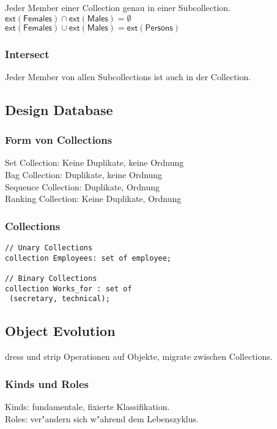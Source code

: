 \documentclass[german, 10pt, a4paper, twocolumn]{scrartcl}
\theoremstyle{definition}
\theoremstyle{remark}
\theoremstyle{example}
\begin{document}
Jeder Member einer Collection genau in einer Subcollection.\\
$\mathsf{ext(Females)} \cap \mathsf{ext(Males)} = \emptyset$\\
$\mathsf{ext(Females)} \cup \mathsf{ext(Males)} = \mathsf{ext(Persons)}$

\subsubsection{Intersect}

Jeder Member von allen Subcollections ist auch in der Collection.

\subsection{Design Database}

\subsubsection{Form von Collections}

Set Collection: Keine Duplikate, keine Ordnung\\
Bag Collection: Duplikate, keine Ordnung\\
Sequence Collection: Duplikate, Ordnung\\
Ranking Collection: Keine Duplikate, Ordnung

\subsubsection{Collections}

\begin{verbatim}
// Unary Collections
collection Employees: set of employee;

// Binary Collections
collection Works_for : set of
 (secretary, technical);
\end{verbatim}

\subsection{Object Evolution}

dress und strip Operationen auf Objekte, migrate zwischen Collections.

\subsubsection{Kinds und Roles}

Kinds: fundamentale, fixierte Klassifikation.\\
Roles: ver"andern sich w"ahrend dem Lebenszyklus.\\
\end{document}

